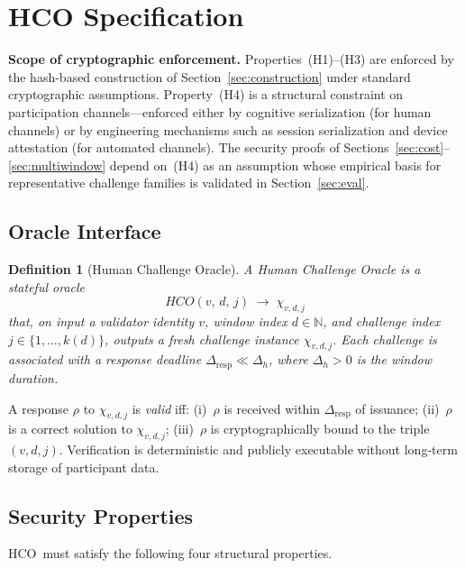 \documentclass[11pt]{article}
\newcommand{\HCO}{HCO\xspace}
\newtheorem{definition}{Definition}
\theoremstyle{remark}
\theoremstyle{plain}
\begin{document}
	\section{HCO Specification}
	\label{sec:spec}
	
	\noindent\textbf{Scope of cryptographic enforcement.}
	Properties~(H1)--(H3) are enforced by the hash-based construction
	of Section~\ref{sec:construction} under standard cryptographic
	assumptions. Property~(H4) is a structural constraint on participation
	channels---enforced either by cognitive serialization (for human
	channels) or by engineering mechanisms such as session serialization
	and device attestation (for automated channels). The security proofs
	of Sections~\ref{sec:cost}--\ref{sec:multiwindow} depend on~(H4)
	as an assumption whose empirical basis for representative challenge
	families is validated in Section~\ref{sec:eval}.
	
	\subsection{Oracle Interface}
	
	\begin{definition}[Human Challenge Oracle]
		\label{def:hco}
		A \emph{Human Challenge Oracle} is a stateful oracle
		\[
		\HCO(v,\, d,\, j) \;\longrightarrow\; \chi_{v,d,j}
		\]
		that, on input a validator identity $v$, window index $d \in \mathbb{N}$,
		and challenge index $j \in \{1,\ldots,k(d)\}$, outputs a fresh challenge
		instance $\chi_{v,d,j}$. Each challenge is associated with a response
		deadline $\Delta_{\mathrm{resp}} \ll \Delta_h$, where $\Delta_h > 0$ is
		the window duration.
	\end{definition}
	
	A response $\rho$ to $\chi_{v,d,j}$ is \emph{valid} iff:
	(i)~$\rho$ is received within $\Delta_{\mathrm{resp}}$ of issuance;
	(ii)~$\rho$ is a correct solution to $\chi_{v,d,j}$;
	(iii)~$\rho$ is cryptographically bound to the triple $(v,d,j)$.
	Verification is deterministic and publicly executable without long-term
	storage of participant data.
	
	\subsection{Security Properties}
	
	\HCO\ must satisfy the following four structural properties.
	
\end{document}
